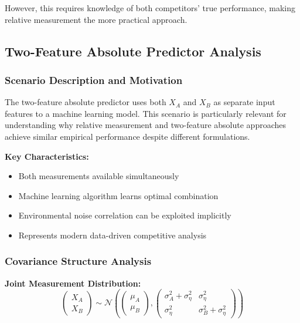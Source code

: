 However, this requires knowledge of both competitors' true performance, making relative measurement the more practical approach.

\subsection{Two-Feature Absolute Predictor Analysis}

\subsubsection{Scenario Description and Motivation}

The two-feature absolute predictor uses both $X_A$ and $X_B$ as separate input features to a machine learning model. This scenario is particularly relevant for understanding why relative measurement and two-feature absolute approaches achieve similar empirical performance despite different formulations.

\textbf{Key Characteristics:}
\begin{itemize}
\item Both measurements available simultaneously
\item Machine learning algorithm learns optimal combination
\item Environmental noise correlation can be exploited implicitly
\item Represents modern data-driven competitive analysis
\end{itemize}

\subsubsection{Covariance Structure Analysis}

\textbf{Joint Measurement Distribution:}
\begin{equation}
\begin{pmatrix} X_A \\ X_B \end{pmatrix} \sim \mathcal{N}\left(\begin{pmatrix} \mu_A \\ \mu_B \end{pmatrix}, \begin{pmatrix} \sigma_A^2 + \sigma_\eta^2 & \sigma_\eta^2 \\ \sigma_\eta^2 & \sigma_B^2 + \sigma_\eta^2 \end{pmatrix}\right)
\end{equation}

